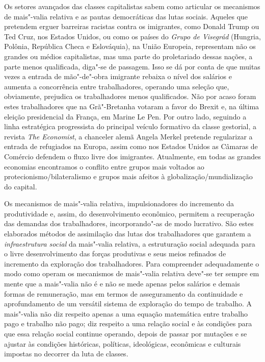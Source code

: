 Os setores avançados das classes capitalistas sabem como articular os
mecanismos de mais"-valia relativa e as pautas democráticas das lutas
sociais. Aqueles que pretendem erguer barreiras racistas contra os
imigrantes, como Donald Trump ou Ted Cruz, nos Estados Unidos, ou como
os países do \emph{Grupo de Visegrád} (Hungria, Polônia, República Checa
e Eslováquia), na União Europeia, representam não os grandes ou médios
capitalistas, mas uma parte do proletariado dessas nações, a parte menos
qualificada, diga"-se de passagem. Isso se dá por conta de que muitas
vezes a entrada de mão"-de"-obra imigrante rebaixa o nível dos salários e
aumenta a concorrência entre trabalhadores, operando uma seleção que,
obviamente, prejudica os trabalhadores menos qualificados. Não por acaso
foram estes trabalhadores que na Grã"-Bretanha votaram a favor do Brexit
e, na última eleição presidencial da França, em Marine Le Pen. Por outro
lado, seguindo a linha estratégica progressista do principal veículo
formativo da classe gestorial, a revista \emph{The Economist}, a
chanceler alemã Angela Merkel pretende regularizar a entrada de
refugiados na Europa, assim como nos Estados Unidos as Câmaras de
Comércio defendem o fluxo livre dos imigrantes. Atualmente, em todas as
grandes economias encontramos o conflito entre grupos mais voltados ao
protecionismo/bilateralismo e grupos mais afeitos à
globalização/mundialização do capital.

Os mecanismos de mais"-valia relativa, impulsionadores do incremento da
produtividade e, assim, do desenvolvimento econômico, permitem a
recuperação das demandas dos trabalhadores, incorporando"-as de modo
lucrativo. São estes elaborados métodos de assimilação das lutas dos
trabalhadores que garantem a \emph{infraestrutura social} da
mais"-valia relativa, a estruturação social adequada para o livre
desenvolvimento das forças produtivas e seus meios refinados de
incremento da exploração dos trabalhadores. Para compreender
adequadamente o modo como operam os mecanismos de mais"-valia relativa
deve"-se ter sempre em mente que a mais"-valia não é e não se mede apenas
pelos salários e demais formas de remuneração, mas em termos de
asseguramento da continuidade e aprofundamento de um versátil sistema de
exploração do tempo de trabalho. A mais"-valia não diz respeito apenas a
uma equação matemática entre trabalho pago e trabalho não pago; diz
respeito a uma relação social e às condições para que essa relação
social continue operando, depois de passar por mutações e se ajustar às
condições históricas, políticas, ideológicas, econômicas e culturais
impostas no decorrer da luta de classes.

